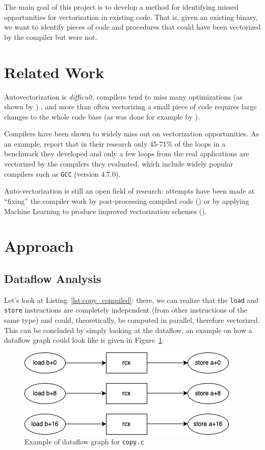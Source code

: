 \documentclass[acmsmall,review, nonacm]{acmart}
\begin{document}


\noindent The main goal of this project is to develop a method for identifying missed opportunities 
for vectorization in existing code. That is, given an existing binary, we want to identify pieces of code
and procedures that could have been vectorized by the compiler but were not.

\section{Related Work}
Autovectorization is \textit{difficult}, compilers tend to miss many optimizations (as shown by \citet{Feng2021})
, and more than often
vectorizing a small piece of code requires large changes to the whole code base 
(as was done for example by \citet{Chen22}).

Compilers have been shown to widely miss out on vectorization opportunities. As an example, \citet{Maleki2021} report that
in their research only 45-71\% of the loops in a benchmark they developed and only a few loops from the real applications 
are vectorized by the compilers they evaluated, which include widely popular compilers such as \texttt{GCC} (version 4.7.0).

Auto-vectorization is still an open field of research: attempts have been made at ``fixing'' the compiler work
by post-processing compiled code (\citet{Porpodas2021}) or by applying Machine Learning to produce improved vectorization schemes
(\citet{Mendis2019}).

\section{Approach}
\subsection{Dataflow Analysis}
Let's look at Listing~\ref{lst:copy_compiled}: there, we can realize that 
the \texttt{load} and \texttt{store} instructions are completely independent (from other instructions of the same type) 
and could, theoretically, be computed in parallel, therefore vectorized. This can be concluded by simply looking at the dataflow,
an example on how a dataflow graph could look like is given in Figure~\ref{fig:dataflow}.

\begin{figure}[h!]
  \includegraphics*[width=0.4\linewidth]{img/dataflow.png}
  \caption{Example of dataflow graph for \texttt{copy.c}}
  \label{fig:dataflow}
\end{figure}
\end{document}
